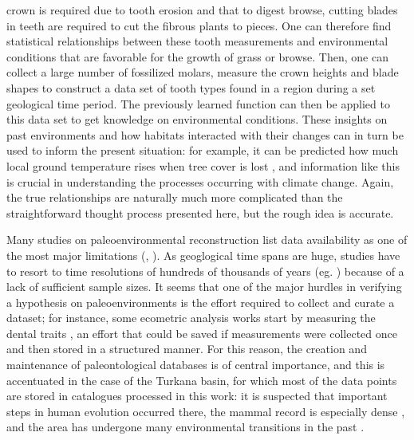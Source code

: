 \documentclass{article}
\begin{document}
crown is required due to tooth erosion and that to digest browse, cutting blades in teeth are required to cut the fibrous plants to pieces.
One can therefore find statistical relationships between these tooth measurements and environmental conditions that are favorable 
for the growth of grass or browse. Then, one can collect a large number of fossilized molars, measure the crown heights and blade shapes to construct a data set of 
tooth types found in a region during a set geological time period. The previously learned function can then be applied to this data set
 to get knowledge on environmental conditions. These insights on 
 past environments and how habitats interacted with their changes can 
 in turn be used to inform the present situation: for example, it can 
 be predicted how much local ground temperature rises when tree cover is lost \cite{fortelius},
 and information like this is crucial in understanding the processes occurring with climate change.
  Again, the true relationships are naturally much more complicated 
 than the straightforward thought process presented here, but the rough idea is accurate.




Many studies on paleoenvironmental reconstruction list data availability as one of the most major limitations (\cite{oksanenHumboldtianApproachLife2019}, \cite{fortelius}).
As geoglogical time spans are huge, studies have to 
resort to time resolutions of hundreds of thousands of years (eg. \cite{fortelius}) because of a lack 
of sufficient sample sizes. It seems that one of the major hurdles in verifying a hypothesis on 
paleoenvironments is the effort required to collect and curate a dataset; for instance, some ecometric
analysis works start by measuring the dental traits \cite{fortelius}, an effort that could be saved 
if measurements were collected once and then stored in a structured manner. For this reason, the 
creation and maintenance of paleontological databases is of central importance, and this is accentuated 
in the case of the Turkana basin, for which most of the data points are stored in catalogues processed in 
this work: it is suspected that
important steps in human evolution occurred there, the mammal record is especially dense \cite{fortelius}, and the area has undergone many environmental transitions in the past \cite{Žliobaitė2023}.
\end{document}
